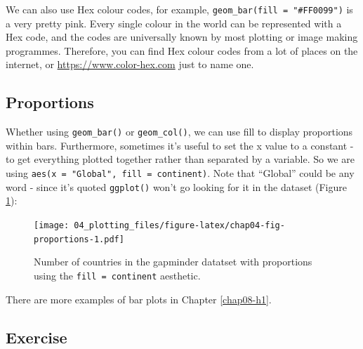 \documentclass[
  12pt,
  krantz2]{krantz}
\makeatletter
\newenvironment{Shaded}{\begin{snugshade}}{\end{snugshade}}
\newcommand{\DataTypeTok}[1]{\textcolor[rgb]{0.13,0.29,0.53}{#1}}
\newcommand{\KeywordTok}[1]{\textcolor[rgb]{0.13,0.29,0.53}{\textbf{#1}}}
\newcommand{\NormalTok}[1]{#1}
\newcommand{\OperatorTok}[1]{\textcolor[rgb]{0.81,0.36,0.00}{\textbf{#1}}}
\newcommand{\StringTok}[1]{\textcolor[rgb]{0.31,0.60,0.02}{#1}}
\newenvironment{kframe}{%
\medskip{}
\setlength{\fboxsep}{.8em}
 \def\at@end@of@kframe{}%
 \ifinner\ifhmode%
  \def\at@end@of@kframe{\end{minipage}}%
  \begin{minipage}{\columnwidth}%
 \fi\fi%
 \def\FrameCommand##1{\hskip\@totalleftmargin \hskip-\fboxsep
 \colorbox{shadecolor}{##1}\hskip-\fboxsep
     \hskip-\linewidth \hskip-\@totalleftmargin \hskip\columnwidth}%
 \MakeFramed {\advance\hsize-\width
   \@totalleftmargin\z@ \linewidth\hsize
   \@setminipage}}%
 {\par\unskip\endMakeFramed%
 \at@end@of@kframe}
\renewenvironment{Shaded}{\begin{kframe}}{\end{kframe}}
\makeatother
\begin{document}
We can also use Hex colour codes, for example, \texttt{geom\_bar(fill\ =\ "\#FF0099")} is a very pretty pink.
Every single colour in the world can be represented with a Hex code, and the codes are universally known by most plotting or image making programmes.
Therefore, you can find Hex colour codes from a lot of places on the internet, or \url{https://www.color-hex.com} just to name one.

\hypertarget{chap04-proportions}{%
\subsection{Proportions}\label{chap04-proportions}}

Whether using \texttt{geom\_bar()} or \texttt{geom\_col()}, we can use fill to display proportions within bars.
Furthermore, sometimes it's useful to set the x value to a constant - to get everything plotted together rather than separated by a variable.
So we are using \texttt{aes(x\ =\ "Global",\ fill\ =\ continent)}.
Note that ``Global'' could be any word - since it's quoted \texttt{ggplot()} won't go looking for it in the dataset (Figure \ref{fig:chap04-fig-proportions}):

\begin{Shaded}
\end{Shaded}

\begin{figure}
\centering
\texttt{[image: 04\_plotting\_files/figure-latex/chap04-fig-proportions-1.pdf]}
\caption{\label{fig:chap04-fig-proportions}Number of countries in the gapminder datatset with proportions using the \texttt{fill\ =\ continent} aesthetic.}
\end{figure}

There are more examples of bar plots in Chapter \ref{chap08-h1}.

\hypertarget{chap04-ex-barplot}{%
\subsection{Exercise}\label{chap04-ex-barplot}}
\end{document}
